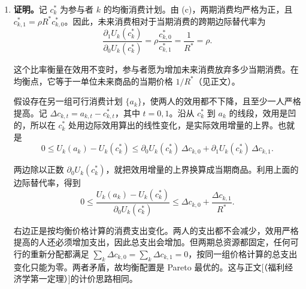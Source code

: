\begin{solution}[blank-type=manual,blank-vsep=9\baselineskip]
\begin{enumerate}[label=(\alph*)]
    \item \textbf{证明。}记 $c_k^*$ 为参与者 $k$ 的均衡消费计划。由 (c)，两期消费均严格为正，且 $c_{k,1}^*=\rho R^*c_{k,0}^*$。因此，未来消费相对于当期消费的跨期边际替代率为
    \[
        \frac{\partial_1U_k(c_k^*)}{\partial_0U_k(c_k^*)}
        =\rho\frac{c_{k,0}^*}{c_{k,1}^*}
        =\frac{1}{R^*}=\rho.
    \]

    这个比率衡量在效用不变时，参与者愿为增加未来消费放弃多少当期消费。在均衡点，它等于一单位未来商品的当期价格 $1/R^*$\ifdefined\WJHandoutKnowledge（见正文）\fi。

    假设存在另一组可行消费计划 $\{a_k\}$，使两人的效用都不下降，且至少一人严格提高。记 $\Delta c_{k,t}=a_{k,t}-c_{k,t}^*$，其中 $t=0,1$。沿从 $c_k^*$ 到 $a_k$ 的线段，效用是凹的，所以在 $c_k^*$ 处用边际效用算出的线性变化，是实际效用增量的上界。也就是
    \[
      0\le U_k(a_k)-U_k(c_k^*)
      \le \partial_0 U_k(c_k^*)\,\Delta c_{k,0}
          +\partial_1 U_k(c_k^*)\,\Delta c_{k,1}.
    \]

    两边除以正数 $\partial_0 U_k(c_k^*)$，就把效用增量的上界换算成当期商品。利用上面的边际替代率，得到
    \[
      0\le \frac{U_k(a_k)-U_k(c_k^*)}{\partial_0 U_k(c_k^*)}
      \le \Delta c_{k,0}+\frac{\Delta c_{k,1}}{R^*}.
    \]

    右边正是按均衡价格计算的消费支出变化。两人的支出都不会减少，效用严格提高的人还必须增加支出，因此总支出会增加。但两期总资源都固定，任何可行的重新分配都满足 $\sum_k\Delta c_{k,0}=\sum_k\Delta c_{k,1}=0$，按同一组价格计算的总支出变化只能为零。两者矛盾，故均衡配置是 Pareto 最优的\ifdefined\WJHandoutKnowledge。这与正文[（福利经济学第一定理）]的计价思路相同\fi。\qedhere
\end{enumerate}
\end{solution}


